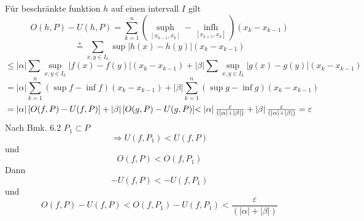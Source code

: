 \begin{enumerate}
Für beschränkte funktion $h$ auf einen intervall $I$ gilt
\[O(h,P) - U(h,P) = \sum\limits_{k = 1}^n {(\mathop {\sup h}\limits_{[{x_{k - 1}},{x_k}]}  - \mathop {\inf h}\limits_{[{x_{k + 1}},{x_k}]} )({x_k} - {x_{k - 1}})} \]
\[\mathop  = \limits^ *  \sum\limits_{x,y \in {I_k}} {\sup \left| {h(x) - h(y)} \right|({x_k} - {x_{k - 1}})} \]
\[ \le \left| \alpha  \right|\sum {\mathop {\sup }\limits_{x,y \in {I_k}} \left| {f(x) - f(y)} \right|({x_k} - {x_{k - 1}})} + \left| \beta  \right|\sum {\mathop {\sup }\limits_{x,y \in {I_k}} \left| {g(x) - g(y)} \right|({x_k} - {x_{k - 1}})} \]
\[ = \left| \alpha  \right|\sum\limits_{k = 1}^n {(\sup f - \inf f)({x_k} - {x_{k - 1}}) + } \left| \beta  \right|\sum\limits_{k = 1}^n {(\sup g - \inf g)({x_k} - {x_{k - 1}})} \]
\[ = \left| \alpha  \right|[O(f,P) - U(f,P)] + \left| \beta  \right|[O(g,P) - U(g,P)] $$ $$< \left| \alpha  \right|\frac{\varepsilon }{{(\left| \alpha  \right| + \left| \beta  \right|)}} + \left| \beta  \right|\frac{\varepsilon }{{(\left| \alpha  \right| + \left| \beta  \right|)}} = \varepsilon \]
Nach Bmk. 6.2 $P_1\subset P$
$$\Rightarrow U(f,P_1)<U(f,P)$$ und $$O(f,P)<O(f,P_1)$$
Dann $$-U(f,P)<-U(f,P_1)$$ und $$O(f,P)-U(f,P)<O(f,P_1)-U(f,P_1)<\frac{\varepsilon}{(\left| \alpha  \right| + \left| \beta  \right|)}$$


\end{enumerate}
